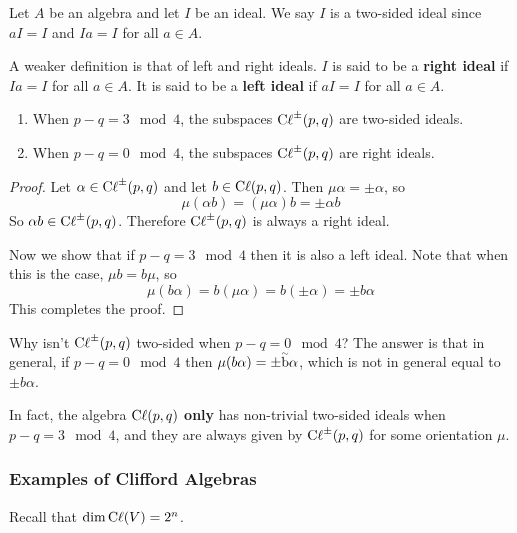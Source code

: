 \begin{defn}
    Let $A$ be an algebra and let $I$ be an ideal. We say $I$ is a two-sided ideal since $aI = I$ and $Ia=I$ for all $a\in A$.

    A weaker definition is that of left and right ideals. $I$ is said to be a \textbf{right ideal} if $Ia=I$ for all $a\in A$. It is said to be a \textbf{left ideal} if $aI=I$ for all $a\in A$.
\end{defn}
\begin{lemma}
\begin{enumerate}
    \item When $p-q=3\mod 4$, the subspaces $\operatorname{C\ell}^{\pm}(p,q)$ are two-sided ideals.
    \item When $p-q=0\mod 4$, the subspaces $\operatorname{C\ell}^{\pm}(p,q)$ are right ideals.
\end{enumerate}
\end{lemma}
\begin{proof}
    Let $\alpha \in \operatorname{C\ell}^{\pm}(p,q)$ and let $b \in \operatorname{C\ell}(p,q)$. Then $\mu\alpha = \pm \alpha$, so 
    \[\mu(\alpha b) = (\mu\alpha)b = \pm \alpha b\]
    So $\alpha b \in \operatorname{C\ell}^{\pm}(p,q)$. Therefore $\operatorname{C\ell}^{\pm}(p,q)$ is always a right ideal.

    Now we show that if $p-q=3\mod 4$ then it is also a left ideal. Note that when this is the case, $\mu b = b\mu$, so
    \[\mu(b\alpha) = b(\mu\alpha) = b(\pm \alpha) = \pm b\alpha\]
    This completes the proof.
\end{proof}
\begin{remark*}
    Why isn't $\operatorname{C\ell}^{\pm}(p,q)$ two-sided when $p-q=0\mod 4$? The answer is that in general, if $p-q=0\mod 4$ then $\mu(b\alpha)=\pm \bigtilde{b}\alpha$, which is not in general equal to $\pm b\alpha$.
\end{remark*}
\begin{remark*}
In fact, the algebra $\operatorname{C\ell}(p,q)$ \textbf{only} has non-trivial two-sided ideals when $p-q=3\mod 4$, and they are always given by $\operatorname{C\ell}^{\pm}(p,q)$ for some orientation $\mu$.
\end{remark*}

\subsubsection{Examples of Clifford Algebras}
\begin{remark*}
    Recall that $\dim \operatorname{C\ell}(V) = 2^n$.
\end{remark*}

